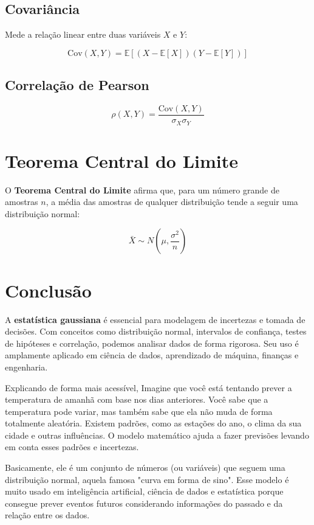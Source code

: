 \documentclass{article}
\begin{document}
\subsection{Covariância}
Mede a relação linear entre duas variáveis $ X $ e $ Y $:

\begin{equation}
    \text{Cov}(X, Y) = \mathbb{E}[(X - \mathbb{E}[X])(Y - \mathbb{E}[Y])]
\end{equation}

\subsection{Correlação de Pearson}

\begin{equation}
    \rho(X, Y) = \frac{\text{Cov}(X, Y)}{\sigma_X \sigma_Y}
\end{equation}

\section{Teorema Central do Limite}
O \textbf{Teorema Central do Limite} afirma que, para um número grande de amostras $ n $, a média das amostras de qualquer distribuição tende a seguir uma distribuição normal:

\begin{equation}
    \bar{X} \sim N\left(\mu, \frac{\sigma^2}{n} \right)
\end{equation}

\section{Conclusão}
A \textbf{estatística gaussiana} é essencial para modelagem de incertezas e tomada de decisões. Com conceitos como distribuição normal, intervalos de confiança, testes de hipóteses e correlação, podemos analisar dados de forma rigorosa. Seu uso é amplamente aplicado em ciência de dados, aprendizado de máquina, finanças e engenharia.

Explicando de forma mais acessível, Imagine que você está tentando prever a temperatura de amanhã com base nos dias anteriores. Você sabe que a temperatura pode variar, mas também sabe que ela não muda de forma totalmente aleatória. 
Existem padrões, como as estações do ano, o clima da sua cidade e outras influências. O modelo matemático ajuda a fazer previsões levando em conta esses padrões e incertezas.

Basicamente, ele é um conjunto de números (ou variáveis) que seguem uma distribuição normal, aquela famosa "curva em forma de sino". Esse modelo é muito usado em inteligência artificial, ciência de dados e estatística porque consegue prever eventos futuros considerando informações do passado e da relação entre os dados.
\end{document}
